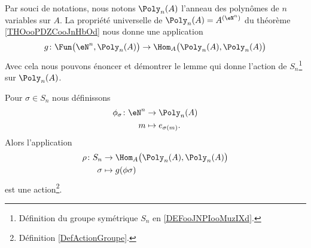 Par souci de notations, nous notons \( \Poly_n(A)\) l'anneau des polynômes de \( n\) variables sur \( A\). La propriété universelle de \( \Poly_n(A)=A^{(\eN^n)}\) du théorème \ref{THOooPDZCooJnHbOd} nous donne une application
\begin{equation}
    g\colon \Fun\big(\eN^n,\Poly_n(A)\big)\to \Hom_A\big( \Poly_n(A),\Poly_n(A) \big)
\end{equation}
Avec cela nous pouvons énoncer et démontrer le lemme qui donne l'action de \( S_n\)\footnote{Définition du groupe symétrique \( S_n\) en \ref{DEFooJNPIooMuzIXd}.} sur \( \Poly_n(A)\).

\begin{lemma}       \label{LEMooIRVQooHvoNBq}
    Pour \( \sigma\in S_n\) nous définissons 
    \begin{equation}
        \begin{aligned}
            \phi_{\sigma}\colon \eN^n&\to \Poly_n(A) \\
            m&\mapsto e_{\sigma(m)}. 
        \end{aligned}
    \end{equation}
    Alors l'application
    \begin{equation}
        \begin{aligned}
            \rho\colon S_n&\to \Hom_A\big( \Poly_n(A),\Poly_n(A) \big) \\
            \sigma&\mapsto g(\phi{\sigma}) 
        \end{aligned}
    \end{equation}
    est une action\footnote{Définition \ref{DefActionGroupe}.}.
\end{lemma}

